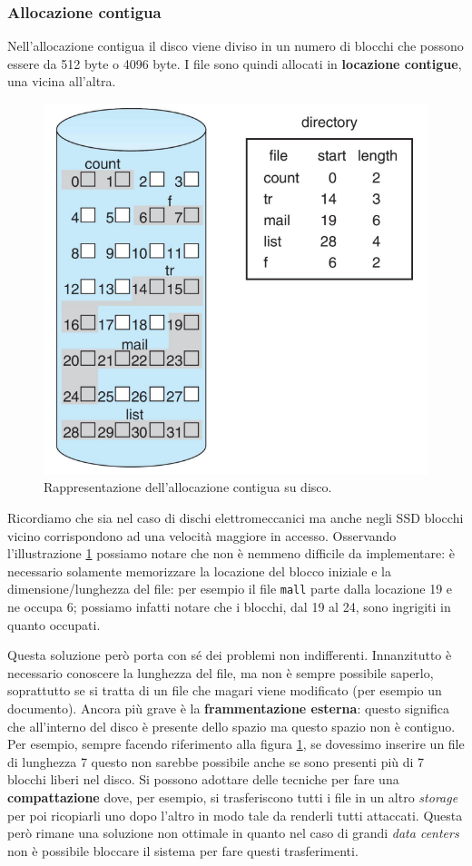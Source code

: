 \subsubsection{Allocazione contigua}
Nell'allocazione contigua il disco viene diviso in un numero di blocchi che possono essere da 512 byte o 4096 byte. I file sono quindi allocati in \textbf{locazione contigue}, una vicina all'altra.
\begin{figure}[h]
    \centering
    \includegraphics[width = .55\textwidth]{../res/imgs/file system implementation/allocazione contigua.png}
    \caption{Rappresentazione dell'allocazione contigua su disco.}
    \label{fig:allocazione contigua}
\end{figure}
Ricordiamo che sia nel caso di dischi elettromeccanici ma anche negli SSD blocchi vicino corrispondono ad una velocità maggiore in accesso. Osservando l'illustrazione \ref{fig:allocazione contigua} possiamo notare che non è nemmeno difficile da implementare: è necessario solamente memorizzare la locazione del blocco iniziale e la dimensione/lunghezza del file: per esempio il file \texttt{mall} parte dalla locazione 19 e ne occupa 6; possiamo infatti notare che i blocchi, dal 19 al 24, sono ingrigiti in quanto occupati.

Questa soluzione però porta con sé dei problemi non indifferenti. Innanzitutto è necessario conoscere la lunghezza del file, ma non è sempre possibile saperlo, soprattutto se si tratta di un file che magari viene modificato (per esempio un documento). Ancora più grave è la \textbf{frammentazione esterna}: questo significa che all'interno del disco è presente dello spazio ma questo spazio non è contiguo. Per esempio, sempre facendo riferimento alla figura \ref{fig:allocazione contigua}, se dovessimo inserire un file di lunghezza 7 questo non sarebbe possibile anche se sono presenti più di 7 blocchi liberi nel disco. Si possono adottare delle tecniche per fare una \textbf{compattazione} dove, per esempio, si trasferiscono tutti i file in un altro \textit{storage} per poi ricopiarli uno dopo l'altro in modo tale da renderli tutti attaccati. Questa però rimane una soluzione non ottimale in quanto nel caso di grandi \textit{data centers} non è possibile bloccare il sistema per fare questi trasferimenti.

